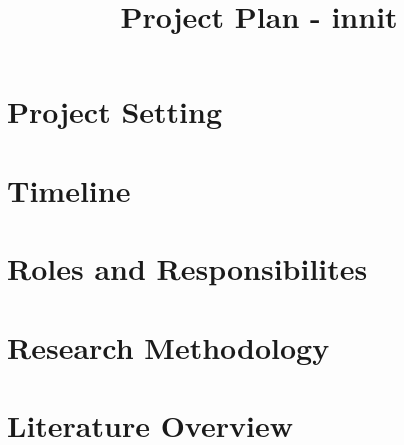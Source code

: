 \documentclass[conference]{IEEEtran}
\begin{document}
%
\title{Project Plan - innit}



\author{ 
}



\maketitle

\section{Project Setting}


\section{Timeline}


\section{Roles and Responsibilites}


\section{Research Methodology}


\section{Literature Overview}










\end{document}
